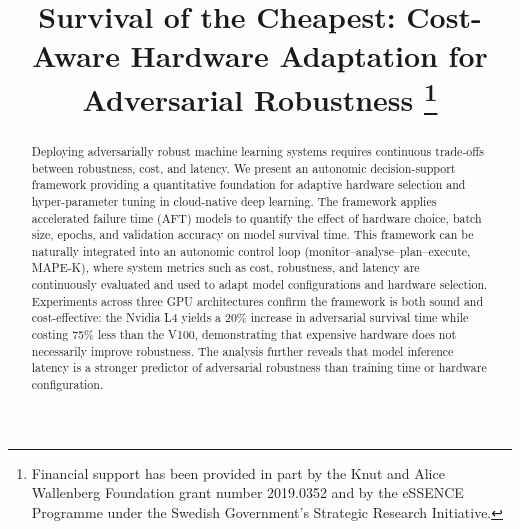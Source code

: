 \documentclass[conference]{IEEEtran}%
\begin{document}
\title{Survival of the Cheapest: Cost-Aware Hardware Adaptation for Adversarial Robustness
\thanks{Financial support has been provided in part by the Knut and Alice Wallenberg Foundation grant number 2019.0352 and by the eSSENCE Programme under the Swedish Government's Strategic Research Initiative.}
}


\author{
\and
{}
\and
{}
\and
{}
}


\maketitle


\begin{abstract}
Deploying adversarially robust machine learning systems requires continuous trade-offs between robustness, cost, and latency.
We present an autonomic decision-support framework providing a quantitative foundation for adaptive hardware selection and hyper-parameter tuning in cloud-native deep learning.
The framework applies accelerated failure time (AFT) models to quantify the effect of hardware choice, batch size, epochs, and validation accuracy on model survival time.
This framework can be naturally integrated into an autonomic control loop (monitor--analyse--plan--execute, MAPE-K), where system metrics such as cost, robustness, and latency are continuously evaluated and used to adapt model configurations and hardware selection.
Experiments across three GPU architectures confirm the framework is both sound and cost-effective: the Nvidia L4 yields a 20\% increase in adversarial survival time while costing 75\% less than the V100, demonstrating that expensive hardware does not necessarily improve robustness. 
The analysis further reveals that model inference latency is a stronger predictor of adversarial robustness than training time or hardware configuration.
\end{abstract}
\end{document}

